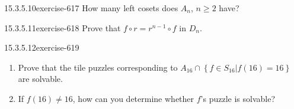 \documentclass[twoside,10pt,]{book}
\numberwithin{equation}{section}
\begin{document}
\begin{divisionsolution}{15.3.5.10}{}{exercise-617}%
\hypertarget{p-5517}{}%
How many left cosets does \(A_n\), \(n\geq 2\) have?%
\end{divisionsolution}%
\begin{divisionsolution}{15.3.5.11}{}{exercise-618}%
\hypertarget{p-5518}{}%
Prove that  \(f\circ r= r^{n-1}\circ f\) in \(D_n\).%
\end{divisionsolution}%
\begin{divisionsolution}{15.3.5.12}{}{exercise-619}%
\hypertarget{p-5519}{}%
\leavevmode%
\begin{enumerate}[label=(\alph*)]
\item\hypertarget{li-2445}{}\hypertarget{p-5520}{}%
Prove that the tile puzzles corresponding to \(A_{16}\cap  \left\{ \left.f \in S_{16} \right| f(16) = 16\right\}\) are solvable.%
\item\hypertarget{li-2446}{}\hypertarget{p-5521}{}%
If  \(f(16)\neq  16\), how can you determine whether  \(f\)'s puzzle is solvable?%
\end{enumerate}
%
\end{divisionsolution}%
\end{document}
